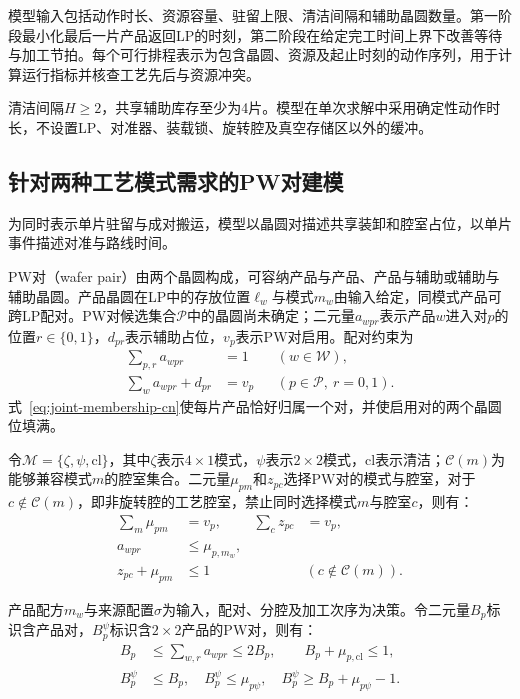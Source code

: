 \documentclass[final,5p,times,twocolumn]{elsarticle}
\begin{document}
模型输入包括动作时长、资源容量、驻留上限、清洁间隔和辅助晶圆数量。第一阶段最小化最后一片产品返回LP的时刻，第二阶段在给定完工时间上界下改善等待与加工节拍。每个可行排程表示为包含晶圆、资源及起止时刻的动作序列，用于计算运行指标并核查工艺先后与资源冲突。

清洁间隔$H\ge2$，共享辅助库存至少为4片。模型在单次求解中采用确定性动作时长，不设置LP、对准器、装载锁、旋转腔及真空存储区以外的缓冲。

\subsection{针对两种工艺模式需求的PW对建模}

为同时表示单片驻留与成对搬运，模型以晶圆对描述共享装卸和腔室占位，以单片事件描述对准与路线时间。

PW对（wafer pair）由两个晶圆构成，可容纳产品与产品、产品与辅助或辅助与辅助晶圆。产品晶圆在LP中的存放位置$\ell_w$与模式$m_w$由输入给定，同模式产品可跨LP配对。PW对候选集合$\mathcal P$中的晶圆尚未确定；二元量$a_{wpr}$表示产品$w$进入对$p$的位置$r\in\{0,1\}$，$d_{pr}$表示辅助占位，$v_p$表示PW对启用。配对约束为
\begin{equation}
\begin{aligned}
\sum_{p,r}a_{wpr}&=1 &&(w\in\mathcal W),\\
\sum_w a_{wpr}+d_{pr}&=v_p &&(p\in\mathcal P,\ r=0,1).
\end{aligned}
\label{eq:joint-membership-cn}
\end{equation}
式~\eqref{eq:joint-membership-cn}使每片产品恰好归属一个对，并使启用对的两个晶圆位填满。

令$\mathcal M=\{\zeta,\psi,\mathrm{cl}\}$，其中$\zeta$表示$4\times1$模式，$\psi$表示$2\times2$模式，$\mathrm{cl}$表示清洁；$\mathcal C(m)$为能够兼容模式$m$的腔室集合。二元量$\mu_{pm}$和$z_{pc}$选择PW对的模式与腔室，对于$c\notin\mathcal C(m)$，即非旋转腔的工艺腔室，禁止同时选择模式$m$与腔室$c$，则有：
\begin{equation}
\begin{aligned}
\sum_m\mu_{pm}&=v_p, &\sum_c z_{pc}&=v_p,\\
a_{wpr}&\le\mu_{p,m_w},\\
z_{pc}+\mu_{pm}&\le1 &&(c\notin\mathcal C(m)).
\end{aligned}
\label{eq:joint-chamber-cn}
\end{equation}

产品配方$m_w$与来源配置$\sigma$为输入，配对、分腔及加工次序为决策。令二元量$B_p$标识含产品对，$B_p^{\psi}$标识含$2\times2$产品的PW对，则有：
\begin{equation}
\begin{aligned}
B_p&\le\sum_{w,r}a_{wpr}\le2B_p,\qquad B_p+\mu_{p,\mathrm{cl}}\le1,\\
B_p^{\psi}&\le B_p,\quad B_p^{\psi}\le\mu_{p\psi},\quad
B_p^{\psi}\ge B_p+\mu_{p\psi}-1.
\end{aligned}
\label{eq:pair-type-cn}
\end{equation}
\end{document}
